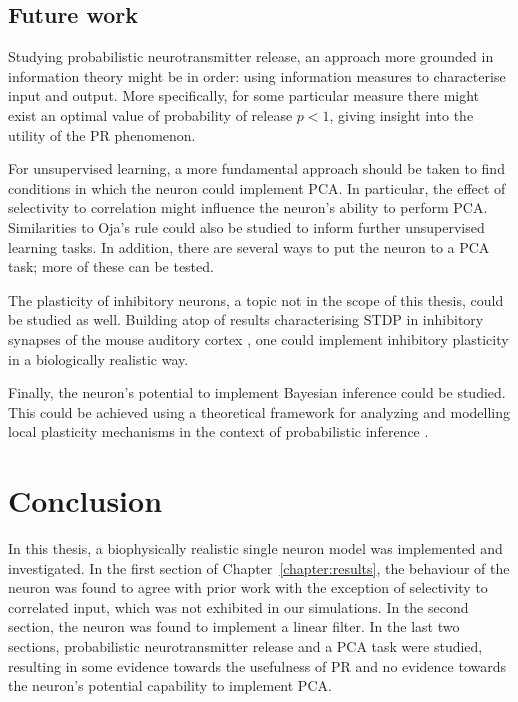 \documentclass[a4paper,12pt]{report}
\theoremstyle{definition}
\begin{document}
\section{Future work}

Studying probabilistic neurotransmitter release, an approach more grounded in information theory might be in order: using information measures to characterise input and output. More specifically, for some particular measure there might exist an optimal value of probability of release $p < 1$, giving insight into the utility of the PR phenomenon.

For unsupervised learning, a more fundamental approach should be taken to find conditions in which the neuron could implement PCA. In particular, the effect of selectivity to correlation might influence the neuron's ability to perform PCA. Similarities to Oja's rule could also be studied to inform further unsupervised learning tasks. In addition, there are several ways to put the neuron to a PCA task; more of these can be tested. 

The plasticity of inhibitory neurons, a topic not in the scope of this thesis, could be studied as well. Building atop of results characterising STDP in inhibitory synapses of the mouse auditory cortex \cite{d2015inhibitory}, one could implement inhibitory plasticity in a biologically realistic way.

Finally, the neuron's potential to implement Bayesian inference could be studied. This could be achieved using a theoretical framework for analyzing and modelling local plasticity mechanisms in the context of probabilistic inference \cite{kappel2015network}.



\chapter*{Conclusion}

In this thesis, a biophysically realistic single neuron model was implemented and investigated. In the first section of Chapter~\ref{chapter:results}, the behaviour of the neuron was found to agree with prior work with the exception of selectivity to correlated input, which was not exhibited in our simulations. In the second section, the neuron was found to implement a linear filter. In the last two sections, probabilistic neurotransmitter release and a PCA task were studied, resulting in some evidence towards the usefulness of PR and no evidence towards the neuron's potential capability to implement PCA.
\end{document}
